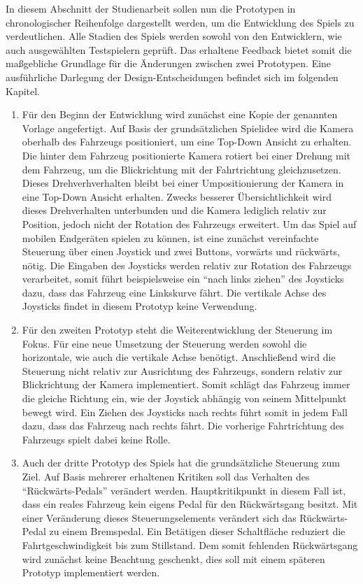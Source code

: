 	In diesem Abschnitt der Studienarbeit sollen nun die Prototypen in chronologischer Reihenfolge dargestellt werden, um die Entwicklung des Spiels zu verdeutlichen. Alle Stadien des Spiels werden sowohl von den Entwicklern, wie auch ausgewählten Testspielern geprüft. Das erhaltene Feedback bietet somit die maßgebliche Grundlage für die Änderungen zwischen zwei Prototypen. Eine ausführliche Darlegung der Design-Entscheidungen befindet sich im folgenden Kapitel.
	\begin{enumerate}[itemindent=*,label=\textbf{Prototyp \arabic*}]
		\item{ Für den Beginn der Entwicklung wird zunächst eine Kopie der genannten Vorlage angefertigt. Auf Basis der grundsätzlichen Spielidee wird die Kamera oberhalb des Fahrzeugs positioniert, um eine Top-Down Ansicht zu erhalten. Die hinter dem Fahrzeug positionierte Kamera rotiert bei einer Drehung mit dem Fahrzeug, um die Blickrichtung mit der Fahrtrichtung gleichzusetzen. Dieses Drehverhverhalten bleibt bei einer Umpositionierung der Kamera in eine Top-Down Ansicht erhalten. Zwecks besserer Übersichtlichkeit wird dieses Drehverhalten unterbunden und die Kamera lediglich relativ zur Position, jedoch nicht der Rotation des Fahrzeugs erweitert. Um das Spiel auf mobilen Endgeräten spielen zu können, ist eine zunächst vereinfachte Steuerung über einen Joystick und zwei Buttons, vorwärts und rückwärts, nötig. Die Eingaben des Joysticks werden relativ zur Rotation des Fahrzeugs verarbeitet, somit führt beispielsweise ein \enquote{nach links ziehen} des Joysticks dazu, dass das Fahrzeug eine Linkskurve fährt. Die vertikale Achse des Joysticks findet in diesem Prototyp keine Verwendung. }
		\item{ Für den zweiten Prototyp steht die Weiterentwicklung der Steuerung im Fokus. Für eine neue Umsetzung der Steuerung werden sowohl die horizontale, wie auch die vertikale Achse benötigt. Anschließend wird die Steuerung nicht relativ zur Ausrichtung des Fahrzeugs, sondern relativ zur Blickrichtung der Kamera implementiert. Somit schlägt das Fahrzeug immer die gleiche Richtung ein, wie der Joystick abhängig von seinem Mittelpunkt bewegt wird. Ein Ziehen des Joysticks nach rechts führt somit in jedem Fall dazu, dass das Fahrzeug nach rechts fährt. Die vorherige Fahrtrichtung des Fahrzeugs spielt dabei keine Rolle. }
		\item{ Auch der dritte Prototyp des Spiels hat die grundsätzliche Steuerung zum Ziel. Auf Basis mehrerer erhaltenen Kritiken soll das Verhalten des \enquote{Rückwärts-Pedals} verändert werden. Hauptkritikpunkt in diesem Fall ist, dass ein reales Fahrzeug kein eigens Pedal für den Rückwärtsgang besitzt. Mit einer Veränderung dieses Steuerungselements verändert sich das Rückwärts-Pedal zu einem Bremspedal. Ein Betätigen dieser Schaltfläche reduziert die Fahrtgeschwindigkeit bis zum Stillstand. Dem somit fehlenden Rückwärtsgang wird zunächst keine Beachtung geschenkt, dies soll mit einem späteren Prototyp implementiert werden.}

\end{enumerate}
